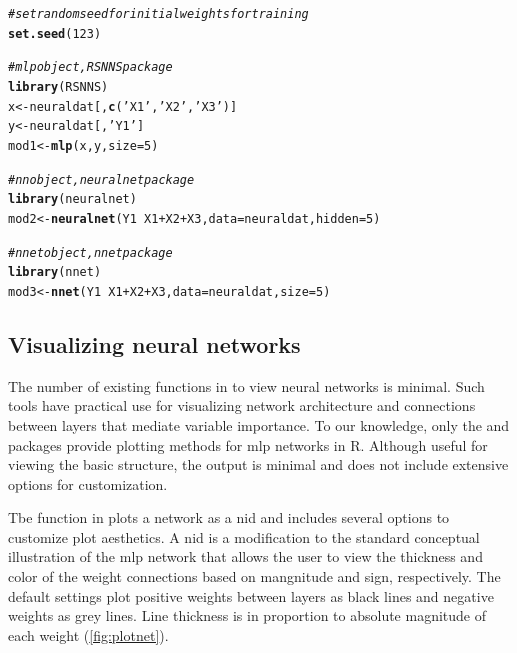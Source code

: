 \documentclass[article,shortnames]{jss}\usepackage[]{graphicx}\usepackage[]{color}
\makeatletter
\newcommand{\hlnum}[1]{\textcolor[rgb]{0.686,0.059,0.569}{#1}}%
\newcommand{\hlstr}[1]{\textcolor[rgb]{0.192,0.494,0.8}{#1}}%
\newcommand{\hlcom}[1]{\textcolor[rgb]{0.678,0.584,0.686}{\textit{#1}}}%
\newcommand{\hlopt}[1]{\textcolor[rgb]{0,0,0}{#1}}%
\newcommand{\hlstd}[1]{\textcolor[rgb]{0.345,0.345,0.345}{#1}}%
\newcommand{\hlkwb}[1]{\textcolor[rgb]{0.69,0.353,0.396}{#1}}%
\newcommand{\hlkwc}[1]{\textcolor[rgb]{0.333,0.667,0.333}{#1}}%
\newcommand{\hlkwd}[1]{\textcolor[rgb]{0.737,0.353,0.396}{\textbf{#1}}}%
\newenvironment{kframe}{%
 \def\at@end@of@kframe{}%
 \ifinner\ifhmode%
  \def\at@end@of@kframe{\end{minipage}}%
  \begin{minipage}{\columnwidth}%
 \fi\fi%
 \def\FrameCommand##1{\hskip\@totalleftmargin \hskip-\fboxsep
 \colorbox{shadecolor}{##1}\hskip-\fboxsep
     \hskip-\linewidth \hskip-\@totalleftmargin \hskip\columnwidth}%
 \MakeFramed {\advance\hsize-\width
   \@totalleftmargin\z@ \linewidth\hsize
   \@setminipage}}%
 {\par\unskip\endMakeFramed%
 \at@end@of@kframe}
\newenvironment{knitrout}{}{} %
\makeatother
\begin{document}
\begin{knitrout}
\color{fgcolor}\begin{kframe}
\begin{alltt}
\hlcom{# set random seed for initial weights for training}
\hlkwd{set.seed}\hlstd{(}\hlnum{123}\hlstd{)}

\hlcom{# mlp object, RSNNS package}
\hlkwd{library}\hlstd{(RSNNS)}
\hlstd{x} \hlkwb{<-} \hlstd{neuraldat[,} \hlkwd{c}\hlstd{(}\hlstr{'X1'}\hlstd{,} \hlstr{'X2'}\hlstd{,} \hlstr{'X3'}\hlstd{)]}
\hlstd{y} \hlkwb{<-} \hlstd{neuraldat[,} \hlstr{'Y1'}\hlstd{]}
\hlstd{mod1} \hlkwb{<-} \hlkwd{mlp}\hlstd{(x, y,} \hlkwc{size} \hlstd{=} \hlnum{5}\hlstd{)}

\hlcom{# nn object, neuralnet package}
\hlkwd{library}\hlstd{(neuralnet)}
\hlstd{mod2} \hlkwb{<-} \hlkwd{neuralnet}\hlstd{(Y1} \hlopt{~} \hlstd{X1} \hlopt{+} \hlstd{X2} \hlopt{+} \hlstd{X3,} \hlkwc{data} \hlstd{= neuraldat,} \hlkwc{hidden} \hlstd{=} \hlnum{5}\hlstd{)}

\hlcom{#nnet object, nnet package}
\hlkwd{library}\hlstd{(nnet)}
\hlstd{mod3} \hlkwb{<-} \hlkwd{nnet}\hlstd{(Y1} \hlopt{~} \hlstd{X1} \hlopt{+} \hlstd{X2} \hlopt{+} \hlstd{X3,} \hlkwc{data} \hlstd{= neuraldat,} \hlkwc{size} \hlstd{=} \hlnum{5}\hlstd{)}
\end{alltt}
\end{kframe}
\end{knitrout}

\subsection{Visualizing neural networks}

The number of existing functions in  to view neural networks is minimal.  Such tools have practical use for visualizing network architecture and connections between layers that mediate variable importance. To our knowledge, only the  and  packages provide plotting methods for \ac{mlp} networks in R.  Although useful for viewing the basic structure, the output is minimal and does not include extensive options for customization.

Tbe  function in  plots a network as a \acl{nid} \citep{Ozesmi99} and includes several options to customize plot aesthetics. A \ac{nid} is a modification to the standard conceptual illustration of the \ac{mlp} network that allows the user to view the thickness and color of the weight connections based on mangnitude and sign, respectively.  The default settings plot positive weights between layers as black lines and negative weights as grey lines. Line thickness is in proportion to absolute magnitude of each weight (\cref{fig:plotnet}).
\end{document}
